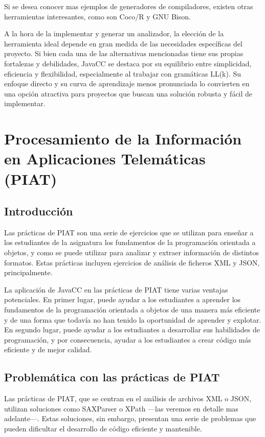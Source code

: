 Si se desea conocer mas ejemplos de generadores de compiladores, existen otras herramientas interesantes, como son Coco/R\cite{cocor} y GNU Bison\cite{gnubison}. 

A la hora de la implementar y generar un analizador, la elección de la herramienta ideal depende en gran medida de las necesidades específicas del proyecto. Si bien cada una de las alternativas mencionadas tiene sus propias fortalezas y debilidades, JavaCC se destaca por su equilibrio entre simplicidad, eficiencia y flexibilidad, especialmente al trabajar con gramáticas LL(k). Su enfoque directo y su curva de aprendizaje menos pronunciada lo convierten en una opción atractiva para proyectos que buscan una solución robusta y fácil de implementar.

\section{Procesamiento de la Información en Aplicaciones Telemáticas (PIAT)}
\subsection{Introducción}
\noindent Las prácticas de PIAT son una serie de ejercicios que se utilizan para enseñar a los estudiantes de la asignatura los fundamentos de la programación orientada a objetos, y como se puede utilizar para analizar y extraer información de distintos formatos. Estas prácticas incluyen ejercicios de análisis de ficheros XML y JSON, principalmente.

La aplicación de JavaCC en las prácticas de PIAT tiene varias ventajas potenciales. En primer lugar, puede ayudar a los estudiantes a aprender los fundamentos de la programación orientada a objetos de una manera más eficiente y de una forma que todavía no han tenido la oportunidad de aprender y explotar. En segundo lugar, puede ayudar a los estudiantes a desarrollar sus habilidades de programación, y por consecuencia, ayudar a los estudiantes a crear código más eficiente y de mejor calidad.
\subsection{Problemática con las prácticas de PIAT}

\noindent Las prácticas de PIAT, que se centran en el análisis de archivos XML o JSON,  utilizan soluciones como SAXParser o XPath ---las veremos en detalle mas adelante---. Estas soluciones, sin embargo, presentan una serie de problemas que pueden dificultar el desarrollo de código eficiente y mantenible.

